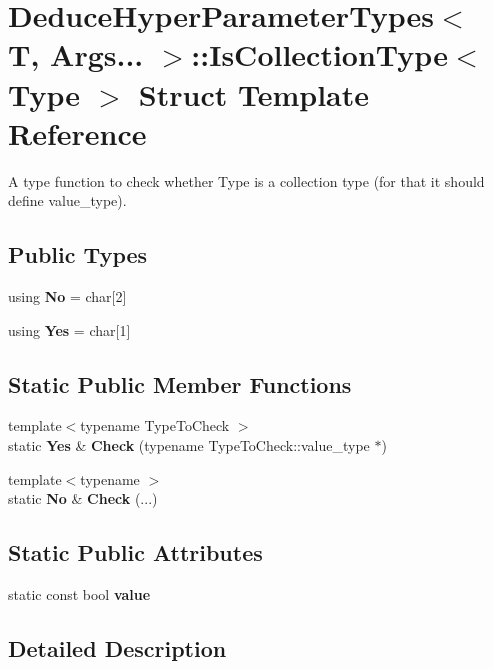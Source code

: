 \section{Deduce\+Hyper\+Parameter\+Types$<$ T, Args... $>$\+:\+:Is\+Collection\+Type$<$ Type $>$ Struct Template Reference}
\label{structmlpack_1_1hpt_1_1DeduceHyperParameterTypes_3_01T_00_01Args_8_8_8_01_4_1_1IsCollectionType}


A type function to check whether Type is a collection type (for that it should define value\+\_\+type).  


\subsection*{Public Types}
\begin{DoxyCompactItemize}
\item 
using \textbf{ No} = char[2]
\item 
using \textbf{ Yes} = char[1]
\end{DoxyCompactItemize}
\subsection*{Static Public Member Functions}
\begin{DoxyCompactItemize}
\item 
{\footnotesize template$<$typename Type\+To\+Check $>$ }\\static \textbf{ Yes} \& \textbf{ Check} (typename Type\+To\+Check\+::value\+\_\+type $\ast$)
\item 
{\footnotesize template$<$typename $>$ }\\static \textbf{ No} \& \textbf{ Check} (...)
\end{DoxyCompactItemize}
\subsection*{Static Public Attributes}
\begin{DoxyCompactItemize}
\item 
static const bool \textbf{ value}
\end{DoxyCompactItemize}


\subsection{Detailed Description}

